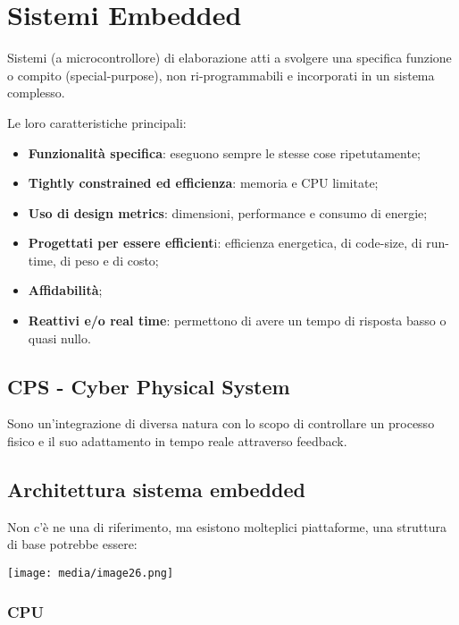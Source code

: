 \section{Sistemi Embedded}\label{sistemi-embedded}

Sistemi (a microcontrollore) di elaborazione atti a svolgere una
specifica funzione o compito (special-purpose), non ri-programmabili e
incorporati in un sistema complesso.

Le loro caratteristiche principali:

\begin{itemize}
\item
  \textbf{Funzionalità specifica}: eseguono sempre le stesse cose
  ripetutamente;
\item
  \textbf{Tightly constrained ed efficienza}: memoria e CPU limitate;
\item
  \textbf{Uso di design metrics}: dimensioni, performance e consumo di
  energie;
\item
  \textbf{Progettati per essere efficient}i: efficienza energetica, di
  code-size, di run-time, di peso e di costo;
\item
  \textbf{Affidabilità};
\item
  \textbf{Reattivi e/o real time}: permettono di avere un tempo di
  risposta basso o quasi nullo.
\end{itemize}

\subsection{CPS - Cyber Physical
System}\label{cps---cyber-physical-system}

Sono un'integrazione di diversa natura con lo scopo di controllare un
processo fisico e il suo adattamento in tempo reale attraverso feedback.

\subsection{Architettura sistema
embedded}\label{architettura-sistema-embedded}

Non c'è ne una di riferimento, ma esistono molteplici piattaforme, una
struttura di base potrebbe essere:

\texttt{[image: media/image26.png]}

\subsubsection{CPU}\label{cpu}

